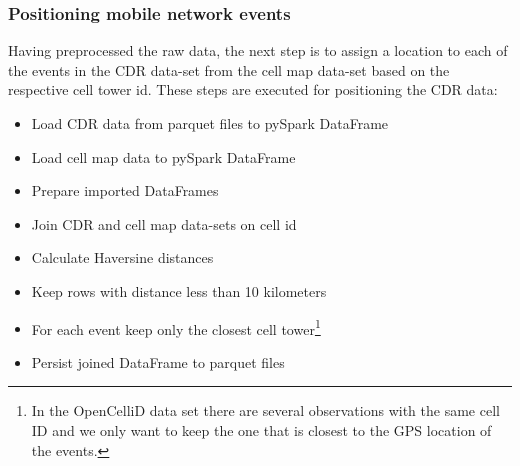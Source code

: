 \subsubsection{Positioning mobile network events}
Having preprocessed the raw data, the next step is to assign a location to each of the events in the CDR data-set from the cell map data-set based on the respective cell tower id. 
These steps are executed for positioning the CDR data:
\begin{itemize}
    \item Load CDR data from parquet files to pySpark DataFrame
    \item Load cell map data to pySpark DataFrame
    \item Prepare imported DataFrames
    \item Join CDR and cell map data-sets on cell id
    \item Calculate Haversine distances
    \item Keep rows with distance less than 10 kilometers
    \item For each event keep only the closest cell tower\footnote{In the OpenCelliD data set there are several observations with the same cell ID and we only want to keep the one that is closest to the GPS location of the events.}
    \item Persist joined DataFrame to parquet files
\end{itemize}
